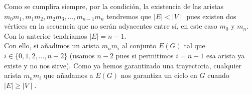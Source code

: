 \documentclass[12pt]{article}
\begin{document}
Como se cumplira siempre, por la condición, la existencia de las aristas $m_0 m_1, m_1 m_2, m_2 m_3, \dots , m_{n-1} m_n$ tendremos que 
$\mid E \mid < \mid V \mid$ pues existen dos vértices en la secuencia que no serán adyacentes entre sí, en este caso $m_0$ y $m_n$. Con lo anterior 
tendríamos $\mid E \mid = n - 1$.\\

Con ello, si añadimos un arista $m_n m_i$ al conjunto $E(G)$ tal que $i \in \{0, 1, 2, \dots, n-2\}$ (usamos $n-2$ pues si permitimos $i = n-1$ esa arista ya existe y no nos sirve).
Como ya hemos garantizado una trayectoria, cualquier arista $m_n m_i$ que añadamos a $E(G)$ nos garantiza un ciclo en $G$ cuando $\mid E \mid \geq \mid V \mid$.
\end{document}
